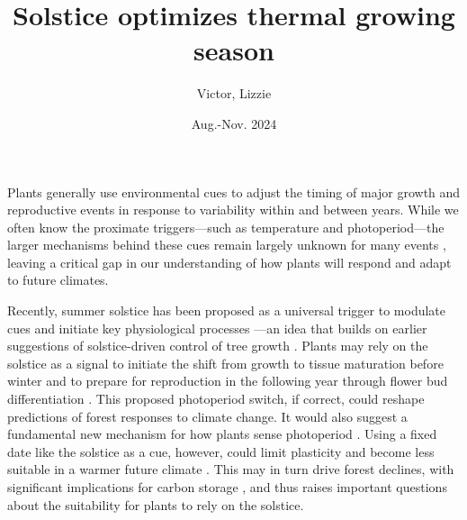 \documentclass[11pt,letter]{article}
\title{Solstice optimizes thermal growing season}
\author{Victor, Lizzie}
\date{Aug.-Nov. 2024}
\begin{document}
\maketitle


Plants generally use environmental cues to adjust the timing of major growth and reproductive events in response to variability within and between years. While we often know the proximate triggers---such as temperature and photoperiod---the larger mechanisms behind these cues remain largely unknown for many events \citep{Chuine2017}, leaving a critical gap in our understanding of how plants will respond and adapt to future climates.

Recently, summer solstice has been proposed as a universal trigger to modulate cues and initiate key physiological processes \citep{Zohner2023, Journe2024}---an idea that builds on earlier suggestions of solstice-driven control of tree growth \citep{Rossi2006}. 
Plants may rely on the solstice as a signal to initiate the shift from growth to tissue maturation before winter and to prepare for reproduction in the following year through flower bud differentiation \citep{Rossi2006, Zohner2023, Journe2024}.
This proposed photoperiod switch, if correct, could reshape predictions of forest responses to climate change. It would also suggest a fundamental new mechanism for how plants sense photoperiod \citep{Gendron2023}. 
Using a fixed date like the solstice as a cue, however, could limit plasticity and become less suitable 
in a warmer future climate \citep{Bonamour2019}. 
This may in turn drive forest declines, with significant implications for carbon storage \citep{green2022limits}, and thus raises important questions about the suitability for plants to rely on the solstice. 
\end{document}
